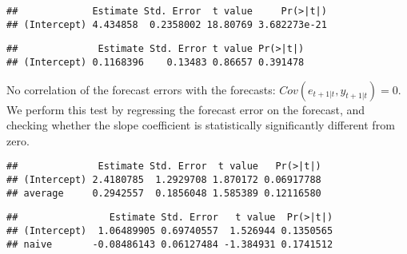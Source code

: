 \documentclass[
  oneside]{book}
\newenvironment{Shaded}{\begin{snugshade}}{\end{snugshade}}
\newcommand{\AttributeTok}[1]{\textcolor[rgb]{0.77,0.63,0.00}{#1}}
\newcommand{\DecValTok}[1]{\textcolor[rgb]{0.00,0.00,0.81}{#1}}
\newcommand{\FunctionTok}[1]{\textcolor[rgb]{0.00,0.00,0.00}{#1}}
\newcommand{\NormalTok}[1]{#1}
\newcommand{\SpecialCharTok}[1]{\textcolor[rgb]{0.00,0.00,0.00}{#1}}
\begin{document}
\begin{verbatim}
##             Estimate Std. Error  t value     Pr(>|t|)
## (Intercept) 4.434858  0.2358002 18.80769 3.682273e-21
\end{verbatim}

\begin{Shaded}
\end{Shaded}

\begin{verbatim}
##              Estimate Std. Error t value Pr(>|t|)
## (Intercept) 0.1168396    0.13483 0.86657 0.391478
\end{verbatim}

No correlation of the forecast errors with the forecasts: \(Cov(e_{t+1|t},y_{t+1|t})=0\). We perform this test by regressing the forecast error on the forecast, and checking whether the slope coefficient is statistically significantly different from zero.

\begin{Shaded}
\end{Shaded}

\begin{verbatim}
##              Estimate Std. Error  t value   Pr(>|t|)
## (Intercept) 2.4180785  1.2929708 1.870172 0.06917788
## average     0.2942557  0.1856048 1.585389 0.12116580
\end{verbatim}

\begin{Shaded}
\end{Shaded}

\begin{verbatim}
##                Estimate Std. Error   t value  Pr(>|t|)
## (Intercept)  1.06489905 0.69740557  1.526944 0.1350565
## naive       -0.08486143 0.06127484 -1.384931 0.1741512
\end{verbatim}
\end{document}
